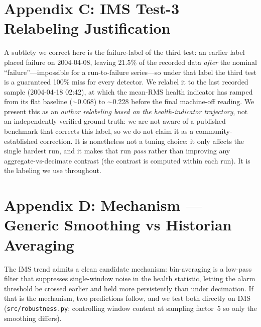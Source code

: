 \documentclass[journal]{IEEEtran}
\begin{document}
\section*{Appendix C: IMS Test-3 Relabeling Justification}
A subtlety we correct
here is the failure-label of the third test: an earlier label placed failure on
2004-04-08, leaving 21.5\% of the recorded data \emph{after} the nominal
``failure''---impossible for a run-to-failure series---so under that label the
third test is a guaranteed 100\% miss for every detector. We relabel it to the
last recorded sample (2004-04-18 02:42), at which the mean-RMS health indicator
has ramped from its flat baseline ($\sim$0.068) to $\sim$0.228 before the final
machine-off reading. We present this as an \emph{author relabeling based on the
health-indicator trajectory}, not an independently verified ground truth: we are not
aware of a published benchmark that corrects this label, so we do not claim it as a
community-established correction. It is nonetheless not a tuning choice: it only
affects the single hardest run, and it makes that run \emph{pass} rather than
improving any aggregate-vs-decimate contrast (the contrast is computed within each
run). It is the labeling we use throughout.

\section*{Appendix D: Mechanism --- Generic Smoothing vs Historian Averaging}
\label{sec:mechanism}
The IMS trend admits a clean candidate mechanism: bin-averaging is a low-pass
filter that suppresses single-window noise in the health statistic, letting the
alarm threshold be crossed earlier and held more persistently than under
decimation. If that is the mechanism, two predictions follow, and we test both
directly on IMS (\texttt{src/robustness.py}; controlling window content at
sampling factor~5 so only the smoothing differs).
\end{document}
